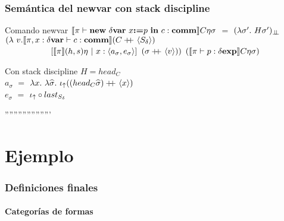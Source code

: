 \documentclass{beamer} %
\begin{document}
\begin{frame}
\frametitle{Sem\'antica del newvar con stack discipline}

\begin{block}{Comando newvar}
$\llbracket \pi \vdash \textbf{new} \ \delta \textbf{var} \ x \textbf{:=} p \ \textbf{in} \ c : \textbf{comm} \rrbracket C\eta\sigma$ $=$
$(\lambda \sigma' . \ H \sigma')_{\bot \!\!\! \bot}$\\
$(\lambda \ v . \llbracket \pi,x:\delta \textbf{var} \vdash c : \textbf{comm} \rrbracket(C+\kern-1.3ex+\kern0.8ex\langle S_\delta \rangle)$\\
\ \ \ \ \ \ \ \ \ \ \ $[\semBrcks{\pi}(h,s)\eta \ | \ x:\lrangles{a_\sigma,e_\sigma}]$
							$(\sigma +\kern-1.3ex+\kern0.8ex \langle v \rangle))$
$(\llbracket \pi \vdash p : \delta \textbf{exp} \rrbracket C\eta\sigma)$
\end{block}

\begin{block}{Con stack discipline}
$H = head_C$\\
$a_\sigma$ $=$ $\lambda x. \ \lambda \widehat{\sigma} . \ \iota_{\uparrow} ((head_{C} \widehat{\sigma}) +\kern-1.3ex+\kern0.8ex \langle x \rangle)$\\
$e_\sigma$ $=$ $ \iota_{\uparrow} \circ last_{S_\delta}$
\end{block}

'''''''''''''''''''''

\end{frame}

\section{Ejemplo}

\begin{frame}
\frametitle{Definiciones finales}
\framesubtitle{Categor\'ias de formas}

\end{frame}
\end{document}
